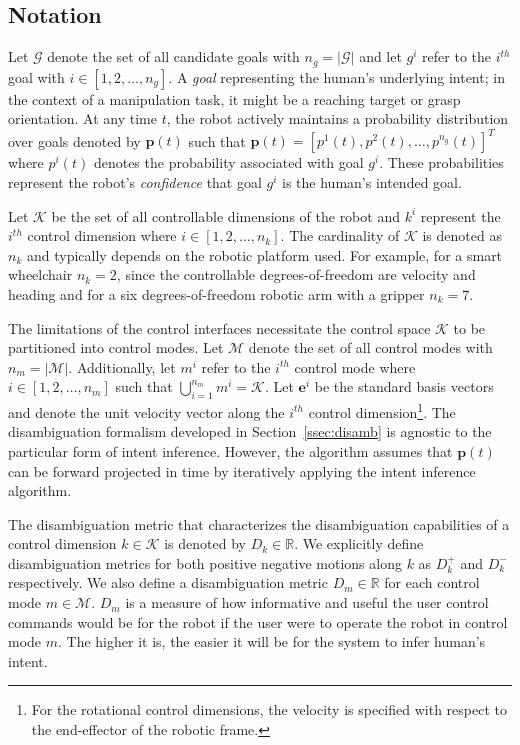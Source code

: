 \subsection{Notation}\label{ssec:notation}
Let $\mathcal{G}$ denote the set of all candidate goals with $n_g = \vert\mathcal{G}\vert$ and let $g^i$ refer to the $i^{th}$ goal with $i \in [1,2,\dots, n_g]$. A \textit{goal} representing the human's underlying intent; in the context of a manipulation task, it might be a reaching target or grasp orientation. At any time $t$, the robot actively maintains a probability distribution over goals denoted by $\boldsymbol{p}(t)$ such that $\boldsymbol{p}(t) = [p^1(t), p^2(t),\dots, p^{n_g}(t)]^{T}$ where $p^i(t)$ denotes the probability associated with goal $g^i$.  These probabilities represent the robot's \textit{confidence} that goal $g^i$ is the human's intended goal. 

Let $\mathcal{K}$ be the set of all controllable dimensions of the robot and $k^i$ represent the $i^{th}$ control dimension where $i \in [1,2,\dots,n_k]$. The cardinality of $\mathcal{K}$ is denoted as $n_k$ and typically depends on the robotic platform used. For example, for a smart wheelchair $n_k = 2$, since the controllable degrees-of-freedom are velocity and heading and for a six degrees-of-freedom robotic arm with a gripper $n_k = 7$. 

The limitations of the control interfaces necessitate the control space $\mathcal{K}$ to be partitioned into control modes. Let $\mathcal{M}$ denote the set of all control modes with $n_m = \vert\mathcal{M}\vert$. Additionally, let $m^i$ refer to the $i^{th}$ control mode where $i \in [1,2,\dots,n_m]$  such that $\bigcup\limits_{i=1}^{n_m} m^i = \mathcal{K}$. Let $\boldsymbol{e}^i$ be the standard basis vectors and denote the unit velocity vector along the $i^{th}$ control dimension\footnote{For the rotational control dimensions, the velocity is specified with respect to the end-effector of the robotic frame.}. The disambiguation formalism developed in Section~\ref{ssec:disamb} is agnostic to the particular form of intent inference. However, the algorithm assumes that $\boldsymbol{p}(t)$ can be forward projected in time by iteratively applying the intent inference algorithm. 

The disambiguation metric that characterizes the disambiguation capabilities of a control dimension $k \in \mathcal{K}$ is denoted by $D_k \in \mathbb{R}$. We explicitly define disambiguation metrics for both positive negative motions along $k$ as $D_k^{+}$ and $D_k^{-}$ respectively. We also define a disambiguation metric $D_m \in \mathbb{R}$ for each control mode $m \in \mathcal{M}$. $D_m$ is a measure of how informative and useful the user control commands would be for the robot if the user were to operate the robot in control mode $m$. The higher it is, the easier it will be for the system to infer human's intent. 


